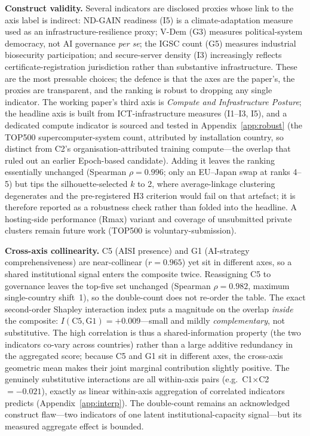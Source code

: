 \documentclass[11pt]{article}
\begin{document}
\textbf{Construct validity.} Several indicators are disclosed proxies whose link to the axis label is indirect: ND-GAIN readiness (I5) is a climate-adaptation measure used as an infrastructure-resilience proxy; V-Dem (G3) measures political-system democracy, not AI governance \emph{per se}; the IGSC count (G5) measures industrial biosecurity participation; and secure-server density (I3) increasingly reflects certificate-registration jurisdiction rather than substantive infrastructure. These are the most pressable choices; the defence is that the axes are the paper's, the proxies are transparent, and the ranking is robust to dropping any single indicator. The working paper's third axis is \emph{Compute and Infrastructure Posture}; the headline axis is built from ICT-infrastructure measures (I1--I3, I5), and a dedicated compute indicator is sourced and tested in Appendix~\ref{app:robust} (the TOP500 supercomputer-system count, attributed by installation country, so distinct from C2's organisation-attributed training compute---the overlap that ruled out an earlier Epoch-based candidate). Adding it leaves the ranking essentially unchanged (Spearman $\rho=0.996$; only an EU--Japan swap at ranks 4--5) but tips the silhouette-selected $k$ to 2, where average-linkage clustering degenerates and the pre-registered H3 criterion would fail on that artefact; it is therefore reported as a robustness check rather than folded into the headline. A hosting-side performance (Rmax) variant and coverage of unsubmitted private clusters remain future work (TOP500 is voluntary-submission).

\textbf{Cross-axis collinearity.} C5 (AISI presence) and G1 (AI-strategy comprehensiveness) are near-collinear ($r=0.965$) yet sit in different axes, so a shared institutional signal enters the composite twice. Reassigning C5 to governance leaves the top-five set unchanged (Spearman $\rho=0.982$, maximum single-country shift~1), so the double-count does not re-order the table. The exact second-order Shapley interaction index puts a magnitude on the overlap \emph{inside} the composite: $I(\text{C5},\text{G1})=+0.009$---small and mildly \emph{complementary}, not substitutive. The high correlation is thus a shared-information property (the two indicators co-vary across countries) rather than a large additive redundancy in the aggregated score; because C5 and G1 sit in different axes, the cross-axis geometric mean makes their joint marginal contribution slightly positive. The genuinely substitutive interactions are all within-axis pairs (e.g.\ C1$\times$C2 $=-0.021$), exactly as linear within-axis aggregation of correlated indicators predicts (Appendix~\ref{app:interp}). The double-count remains an acknowledged construct flaw---two indicators of one latent institutional-capacity signal---but its measured aggregate effect is bounded.
\end{document}
